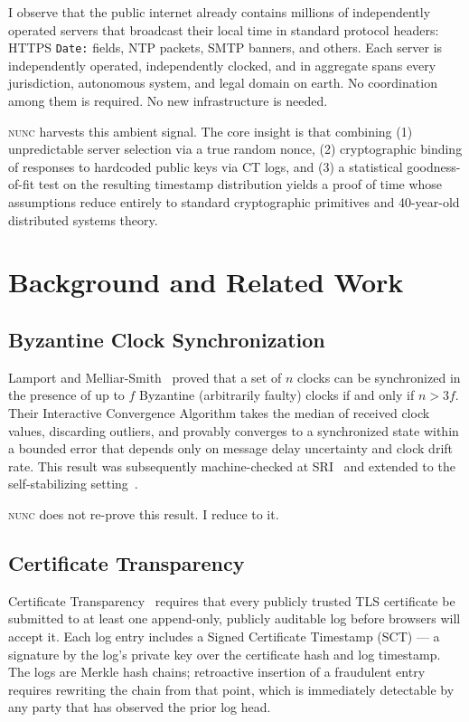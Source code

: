 \documentclass[11pt,twocolumn]{article}
\begin{document}
I observe that the public internet already contains millions of independently
operated servers that broadcast their local time in standard protocol headers:
HTTPS \texttt{Date:} fields, NTP packets, SMTP banners, and others.  Each
server is independently operated, independently clocked, and in aggregate spans
every jurisdiction, autonomous system, and legal domain on earth.  No
coordination among them is required.  No new infrastructure is needed.

\textsc{nunc} harvests this ambient signal.  The core insight is that
combining (1) unpredictable server selection via a true random nonce, (2)
cryptographic binding of responses to hardcoded public keys via CT logs, and
(3) a statistical goodness-of-fit test on the resulting timestamp distribution
yields a proof of time whose assumptions reduce entirely to standard
cryptographic primitives and 40-year-old distributed systems theory.

\section{Background and Related Work}

\subsection{Byzantine Clock Synchronization}

Lamport and Melliar-Smith~\cite{lamport1984} proved that a set of $n$ clocks
can be synchronized in the presence of up to $f$ Byzantine (arbitrarily
faulty) clocks if and only if $n > 3f$.  Their Interactive Convergence
Algorithm takes the median of received clock values, discarding outliers, and
provably converges to a synchronized state within a bounded error that depends
only on message delay uncertainty and clock drift rate.  This result was
subsequently machine-checked at SRI~\cite{rushby1991} and extended to the
self-stabilizing setting~\cite{daliot2003}.

\textsc{nunc} does not re-prove this result.  I reduce to it.

\subsection{Certificate Transparency}

Certificate Transparency~\cite{rfc6962} requires that every publicly trusted
TLS certificate be submitted to at least one append-only, publicly auditable
log before browsers will accept it.  Each log entry includes a Signed
Certificate Timestamp (SCT) — a signature by the log's private key over the
certificate hash and log timestamp.  The logs are Merkle hash chains; retroactive
insertion of a fraudulent entry requires rewriting the chain from that point,
which is immediately detectable by any party that has observed the prior log
head.
\end{document}
